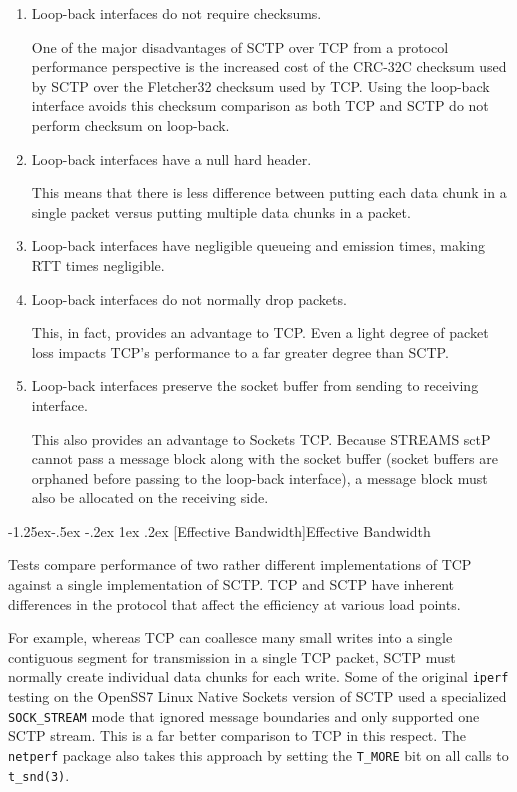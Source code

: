 \documentclass[letterpaper,final,notitlepage,twocolumn,10pt,twoside]{article}
\makeatletter
\renewcommand\subsubsection{\@startsection{subsubsection}{3}{\z@}%
                                     {-1.25ex\@plus -.5ex \@minus -.2ex}%
                                     {1ex \@plus .2ex}%
                                     {\normalfont\normalsize\bfseries}}
\makeatother
\begin{document}
\begin{enumerate}

\item Loop-back interfaces do not require checksums.

One of the major disadvantages of SCTP over TCP from a protocol performance perspective is the
increased cost of the CRC-32C checksum used by SCTP over the Fletcher32 checksum used by TCP.  Using
the loop-back interface avoids this checksum comparison as both TCP and SCTP do not perform checksum
on loop-back.

\item Loop-back interfaces have a null hard header.

This means that there is less difference between putting each data chunk in a single packet versus
putting multiple data chunks in a packet.

\item Loop-back interfaces have negligible queueing and emission times, making RTT times negligible.

\item Loop-back interfaces do not normally drop packets.

This, in fact, provides an advantage to TCP.  Even a light degree of packet loss impacts TCP's
performance to a far greater degree than SCTP.

\item Loop-back interfaces preserve the socket buffer from sending to receiving interface.

This also provides an advantage to Sockets TCP.  Because STREAMS sctP cannot pass a message block
along with the socket buffer (socket buffers are orphaned before passing to the loop-back
interface), a message block must also be allocated on the receiving side.

\end{enumerate}

\subsubsection[Effective Bandwidth]{Effective Bandwidth}

Tests compare performance of two rather different implementations of TCP against a single
implementation of SCTP.  TCP and SCTP have inherent differences in the protocol that affect the
efficiency at various load points.

For example, whereas TCP can coallesce many small writes into a single contiguous segment for
transmission in a single TCP packet, SCTP must normally create individual data chunks for each
write.  Some of the original \texttt{iperf} testing on the OpenSS7 Linux Native Sockets version of
SCTP used a specialized \texttt{SOCK\_STREAM} mode that ignored message boundaries and only
supported one SCTP stream.  This is a far better comparison to TCP in this respect.  The
\texttt{netperf} package also takes this approach by setting the \texttt{T\_MORE} bit on all calls
to \texttt{t\_snd(3)}.
\end{document}
